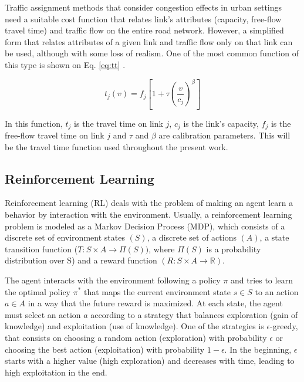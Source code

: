 \documentclass{RITA}
\newcommand{\travTime}{\ensuremath{t_j}} 	%
\newcommand{\fftt}{\ensuremath{f_j}} 		%
\newcommand{\linkCap}{\ensuremath{c_j}}		%
\newcommand{\veh}{\ensuremath{v}}		%
\begin{document}
Traffic assignment methods that consider congestion effects in urban settings need a suitable cost function that relates link's attributes (capacity, free-flow travel time) and traffic flow on the entire road network. However, a simplified form that relates attributes of a  given link and traffic flow only on that link can be used, although with some loss of realism. One of the most common function of this type is shown on Eq. \eqref{eq:tt} \cite{Ortuzar&Willumsen2001}.

\begin{equation}
\label{eq:tt}
\travTime(\veh) = \fftt[1 + \tau \left(\frac{\veh}{\linkCap}\right)^\beta]
\end{equation}

In this function, $\travTime$ is the travel time on link $j$, $\linkCap$ is the link's capacity, $\fftt$ is the free-flow travel time on link $j$ and $\tau$ and $\beta$ are calibration parameters. This will be the travel time function used throughout the present work.

\subsection{Reinforcement Learning}
\label{sec:rl}
Reinforcement learning (RL) deals with the problem of making an agent learn a behavior by interaction with the environment. Usually, a reinforcement learning problem is modeled as a Markov Decision Process (MDP), which consists of a discrete set of environment states $(S)$, a discrete set of actions $(A)$, a state transition function ($T: S \times A \to \Pi(S))$, where $\Pi(S)$ is a probability distribution over S) and a reward function $(R: S \times A \to \mathbb{R})$. %

The agent interacts with the environment following a policy $\pi$ and tries to learn the optimal policy $\pi^*$ that maps the current environment state $s \in S$ to an action $a \in A$ in a way that the future reward is maximized. At each state, the agent must select an action $a$ according to a strategy that balances exploration (gain of knowledge) and exploitation (use of knowledge). One of the strategies is $\epsilon$-greedy, that consists on choosing a random action (exploration) with probability $\epsilon$ or choosing the best action (exploitation) with probability $1 - \epsilon$. In the beginning, $\epsilon$ starts with a higher value (high exploration) and decreases with time, leading to high exploitation in the end.
\end{document}
